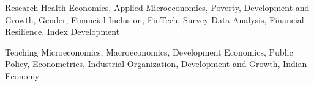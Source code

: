 

\begin{cvskills}
\cvskill
{Research} %
{Health Economics, Applied Microeconomics, Poverty, Development and Growth, Gender, Financial Inclusion, FinTech, Survey Data Analysis, Financial Resilience, Index Development } %

\cvskill
{Teaching} %
{Microeconomics, Macroeconomics, Development Economics, Public Policy, Econometrics, Industrial Organization, Development and Growth, Indian Economy} %

\end{cvskills}
\relax